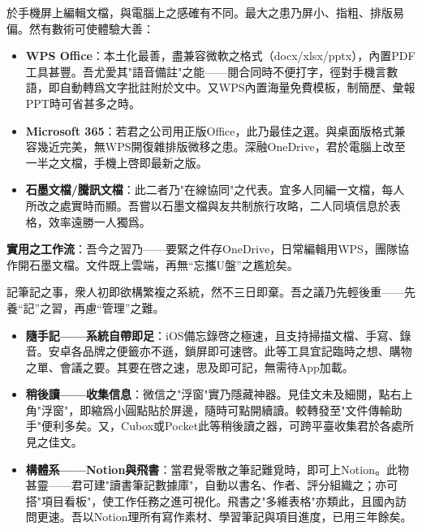 


於手機屏上編輯文檔，與電腦上之感確有不同。最大之患乃屏小、指粗、排版易偏。然有數術可使體驗大善：

\begin{itemize}
  \item \textbf{WPS Office}：本土化最善，盡兼容微軟之格式（docx/xlsx/pptx），內置PDF工具甚豐。吾尤愛其"語音備註"之能——閱合同時不便打字，徑對手機言數語，即自動轉爲文字批註附於文中。又WPS內置海量免費模板，制簡歷、彙報PPT時可省甚多之時。
  \item \textbf{Microsoft 365}：若君之公司用正版Office，此乃最佳之選。與桌面版格式兼容幾近完美，無WPS開復雜排版微移之患。深融OneDrive，君於電腦上改至一半之文檔，手機上啓即最新之版。
  \item \textbf{石墨文檔/騰訊文檔}：此二者乃"在線協同"之代表。宜多人同編一文檔，每人所改之處實時而顯。吾嘗以石墨文檔與友共制旅行攻略，二人同填信息於表格，效率遠勝一人獨爲。
\end{itemize}

\textbf{實用之工作流}：吾今之習乃——要緊之件存OneDrive，日常編輯用WPS，團隊協作開石墨文檔。文件既上雲端，再無“忘攜U盤”之尷尬矣。


記筆記之事，衆人初即欲構繁複之系統，然不三日即棄。吾之議乃先輕後重——先養“記”之習，再慮“管理”之難。

\begin{itemize}
  \item \textbf{隨手記——系統自帶即足}：iOS備忘錄啓之極速，且支持掃描文檔、手寫、錄音。安卓各品牌之便籤亦不遜，鎖屏即可速啓。此等工具宜記臨時之想、購物之單、會議之要。其要在啓之速，思及即可記，無需待App加載。
  \item \textbf{稍後讀——收集信息}：微信之"浮窗"實乃隱藏神器。見佳文未及細閱，點右上角"浮窗"，即縮爲小圓點貼於屏邊，隨時可點開續讀。較轉發至"文件傳輸助手"便利多矣。又，Cubox或Pocket此等稍後讀之器，可跨平臺收集君於各處所見之佳文。
  \item \textbf{構體系——Notion與飛書}：當君覺零散之筆記難覓時，即可上Notion。此物甚靈——君可建"讀書筆記數據庫"，自動以書名、作者、評分組織之；亦可搭"項目看板"，使工作任務之進可視化。飛書之"多維表格"亦類此，且國內訪問更速。吾以Notion理所有寫作素材、學習筆記與項目進度，已用三年餘矣。
\end{itemize}

